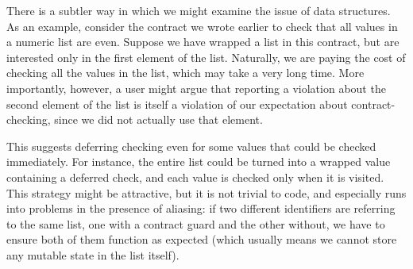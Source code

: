 There is a subtler way in which we might examine the issue of data structures.
As an example, consider the contract we wrote earlier to check that all values
in a numeric list are even. Suppose we have wrapped a list in this contract, but
are interested only in the first element of the list. Naturally, we are paying
the cost of checking all the values in the list, which may take a very long
time. More importantly, however, a user might argue that reporting a violation
about the second element of the list is itself a violation of our expectation
about contract-checking, since we did not actually use that element.

This suggests deferring checking even for some values that could be checked
immediately. For instance, the entire list could be turned into a wrapped value
containing a deferred check, and each value is checked only when it is visited.
This strategy might be attractive, but it is not trivial to code, and especially
runs into problems in the presence of aliasing: if two different identifiers are
referring to the same list, one with a contract guard and the other without, we
have to ensure both of them function as expected (which usually means we cannot
store any mutable state in the list itself).
